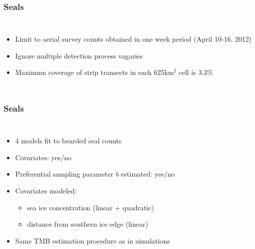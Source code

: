 \documentclass[serif,mathserif]{beamer}
\begin{document}
\begin{frame}
\frametitle{Seals}
  \begin{columns}[c]
\column{2in}
\begin{itemize}
\item Limit to aerial survey counts obtained in one week period (April 10-16, 2012)
\item Ignore multiple detection process vagaries
\item Maximum coverage of strip transects in each 625km$^2$ cell is 3.3\%
\end{itemize}
\column{2.5in}
 \pause
\end{columns}
\end{frame}

\begin{frame}
\frametitle{Seals}
  \begin{columns}[c]
\column{1.5in}
 \pause
\column{3in}
\begin{itemize}
\item 4 models fit to bearded seal counts \pause
\item Covariates: yes/no \pause
\item Preferential sampling parameter $b$ estimated: yes/no \pause
\item Covariates modeled:
    \begin{itemize}
     \item \textcolor{noaaturq}{sea ice concentration} (linear + quadratic)
     \item \textcolor{noaaturq}{distance from southern ice edge} (linear) \pause
     \end{itemize}
\item Same TMB estimation procedure as in simulations
\end{itemize}
\end{columns}
\end{frame}
\end{document}
